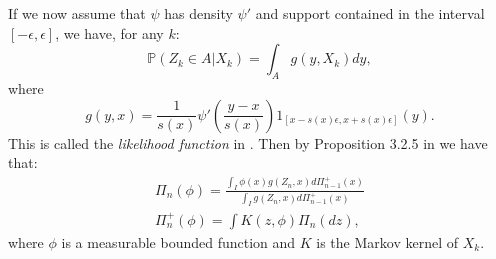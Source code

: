 \documentclass{article}
\newcommand{\1}{\mathbbm{1}}
\begin{document}

If we now assume that $\psi$ has density $\psi'$ and support contained in the interval $[-\epsilon, \epsilon]$, we have, for any $k:$
$$
\mathbb{P}(Z_k\in A|X_k)=\int_A g(y, X_k)dy,
$$
where
$$
g(y,x)=\frac{1}{s(x)}\psi'\left(\frac{y-x}{s(x)}\right) 1_{[x-s(x)\epsilon,x+ s(x)\epsilon]}(y) .
$$
This is called the {\em likelihood function} in \cite{BDM}. Then by Proposition 3.2.5 in \cite{CMR} we have that:
\begin{eqnarray}
\Pi_n(\phi)=\frac{\int_I\phi(x)g(Z_n,x)d\Pi^{+}_{n-1}(x)}{\int_Ig(Z_n,x)d\Pi^{+}_{n-1}(x)}\label{Eq:Filt1}\\
\Pi^{+}_n(\phi)=\int K(z,\phi)\Pi_n(dz),\label{Eq:Filt2}
\end{eqnarray}
where $\phi$ is a measurable bounded function and $K$ is the Markov kernel of $X_k.$ 
\end{document}
